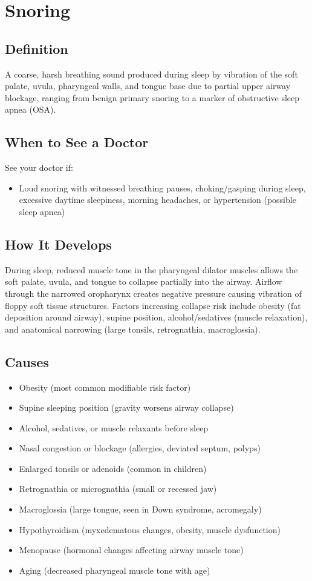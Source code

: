 \chapter{Snoring}

\section*{Definition}
A coarse, harsh breathing sound produced during sleep by vibration of the soft palate, uvula, pharyngeal walls, and tongue base due to partial upper airway blockage, ranging from benign primary snoring to a marker of obstructive sleep apnea (OSA).

\section*{When to See a Doctor}
See your doctor if:
\begin{itemize}
  \item Loud snoring with witnessed breathing pauses, choking/gasping during sleep, excessive daytime sleepiness, morning headaches, or hypertension (possible sleep apnea)
\end{itemize}

\section*{How It Develops}
During sleep, reduced muscle tone in the pharyngeal dilator muscles allows the soft palate, uvula, and tongue to collapse partially into the airway. Airflow through the narrowed oropharynx creates negative pressure causing vibration of floppy soft tissue structures. Factors increasing collapse risk include obesity (fat deposition around airway), supine position, alcohol/sedatives (muscle relaxation), and anatomical narrowing (large tonsils, retrognathia, macroglossia).

\section*{Causes}
\begin{itemize}
  \item Obesity (most common modifiable risk factor)
  \item Supine sleeping position (gravity worsens airway collapse)
  \item Alcohol, sedatives, or muscle relaxants before sleep
  \item Nasal congestion or blockage (allergies, deviated septum, polyps)
  \item Enlarged tonsils or adenoids (common in children)
  \item Retrognathia or micrognathia (small or recessed jaw)
  \item Macroglossia (large tongue, seen in Down syndrome, acromegaly)
  \item Hypothyroidism (myxedematous changes, obesity, muscle dysfunction)
  \item Menopause (hormonal changes affecting airway muscle tone)
  \item Aging (decreased pharyngeal muscle tone with age)
\end{itemize}

